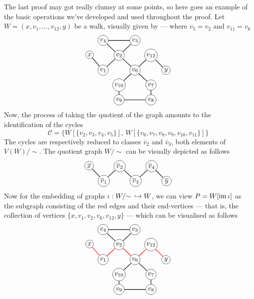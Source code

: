 The last proof may got really clumsy at some points, so here goes an example of
the basic operations we've developed and used throughout the proof. Let \(W =
(x, v_1, \dots, v_{12}, y)\) be a walk, visually given by --- where \(v_5 =
v_2\) and \(v_{11} = v_6\)
\[
\begin{tikzcd}[%
  , cells={nodes={circle, draw, inner sep=1.5pt}}
  , every arrow/.append style={dash,thick}
  , row sep=tiny
  , column sep=tiny
  ]
            &v_4 \ar[rr] \ar[dr] & &v_3 \ar[dl] & &
  \\
  x \ar[dr] & &v_2 \ar[dl] \ar[dr] & &v_{12} \ar[dr] &
  \\
            &v_1 & &v_6 \ar[ur] \ar[dl] \ar[dr] & &y
  \\
            & &v_{10} \ar[d] & &v_7 \ar[d] &
  \\
            & &v_9 \ar[rr] & &v_8 &
\end{tikzcd}
\]
Now, the process of taking the quotient of the graph amounts to the
identification of the cycles
\[
  \mathcal C = \{
    W[\{v_2, v_3, v_4, v_5\}],\,
    W[\{v_6, v_7, v_8, v_9, v_{10}, v_{11}\}]
  \}
\]
The cycles are respectively reduced to classes \(\overline v_2\) and \(\overline
v_3\), both elements of \(V(W)/{\sim}\). The quotient graph \(W/{\sim}\) can be visually
depicted as follows
\[
\begin{tikzcd}[%
  , cells={nodes={circle, draw, inner sep=1.5pt}}
  , every arrow/.append style={dash,thick}
  , row sep=tiny
  , column sep=tiny
  ]
  \overline x \ar[dr]
  & &\overline v_2 \ar[dl] \ar[dr] & &\overline v_4 \ar[dl] \ar[dr] &
  \\
  &\overline v_1 & &\overline v_3 & &\overline y
\end{tikzcd}
\]
Now for the embedding of graphs \(\iota: W/{\sim}\, \hookrightarrow W\), we can view \(P =
W[\operatorname{im} \iota]\) as the subgraph consisting of the red edges and their end-vertices
--- that is, the collection of vertices \(\{x, v_1, v_2, v_6, v_{12}, y\}\) ---
which can be visualised as follows
\[
\begin{tikzcd}[%
  , cells={nodes={circle, draw, inner sep=1.5pt}}
  , every arrow/.append style={dash,thick}
  , row sep=tiny
  , column sep=tiny
  ]
            &v_4 \ar[rr] \ar[dr] & &v_3 \ar[dl] & &
  \\
  x \ar[dr, color=red] & &v_2 \ar[dl, color=red] \ar[dr, color=red]
                        & &v_{12} \ar[dr, color=red] &
  \\
            &v_1 & &v_6 \ar[ur, color=red] \ar[dl] \ar[dr] & &y
  \\
            & &v_{10} \ar[d] & &v_7 \ar[d] &
  \\
            & &v_9 \ar[rr] & &v_8 &
\end{tikzcd}
\]

